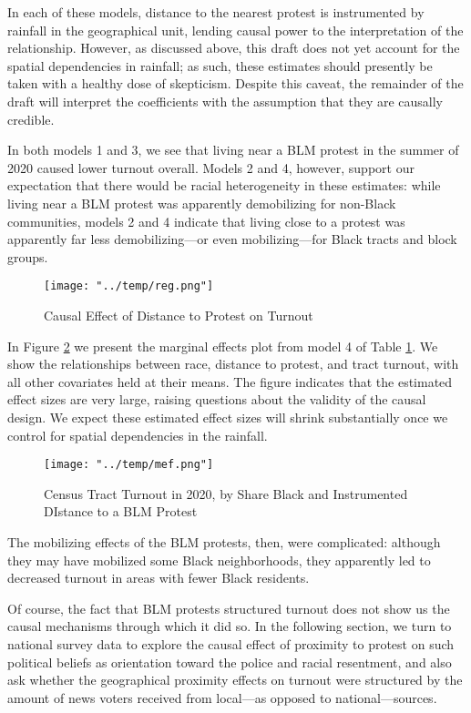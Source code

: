 \documentclass[
  12pt,
]{article}
\begin{document}
In each of these models, distance to the nearest protest is instrumented by rainfall in the geographical unit, lending causal power to the interpretation of the relationship. However, as discussed above, this draft does not yet account for the spatial dependencies in rainfall; as such, these estimates should presently be taken with a healthy dose of skepticism. Despite this caveat, the remainder of the draft will interpret the coefficients with the assumption that they are causally credible.

In both models 1 and 3, we see that living near a BLM protest in the summer of 2020 caused lower turnout overall. Models 2 and 4, however, support our expectation that there would be racial heterogeneity in these estimates: while living near a BLM protest was apparently demobilizing for non-Black communities, models 2 and 4 indicate that living close to a protest was apparently far less demobilizing---or even mobilizing---for Black tracts and block groups.

\begin{figure}
\hypertarget{tab:bg-tract-to}{%
\centering
\texttt{[image: "../temp/reg.png"]}
\caption{Causal Effect of Distance to Protest on Turnout}\label{tab:bg-tract-to}
}
\end{figure}

In Figure \ref{fig:mef-t-to} we present the marginal effects plot from model 4 of Table \ref{tab:bg-tract-to}. We show the relationships between race, distance to protest, and tract turnout, with all other covariates held at their means. The figure indicates that the estimated effect sizes are very large, raising questions about the validity of the causal design. We expect these estimated effect sizes will shrink substantially once we control for spatial dependencies in the rainfall.

\begin{figure}
\hypertarget{fig:mef-t-to}{%
\centering
\texttt{[image: "../temp/mef.png"]}
\caption{Census Tract Turnout in 2020, by Share Black and Instrumented DIstance to a BLM Protest}\label{fig:mef-t-to}
}
\end{figure}

The mobilizing effects of the BLM protests, then, were complicated: although they may have mobilized some Black neighborhoods, they apparently led to decreased turnout in areas with fewer Black residents.

Of course, the fact that BLM protests structured turnout does not show us the causal mechanisms through which it did so. In the following section, we turn to national survey data to explore the causal effect of proximity to protest on such political beliefs as orientation toward the police and racial resentment, and also ask whether the geographical proximity effects on turnout were structured by the amount of news voters received from local---as opposed to national---sources.
\end{document}
